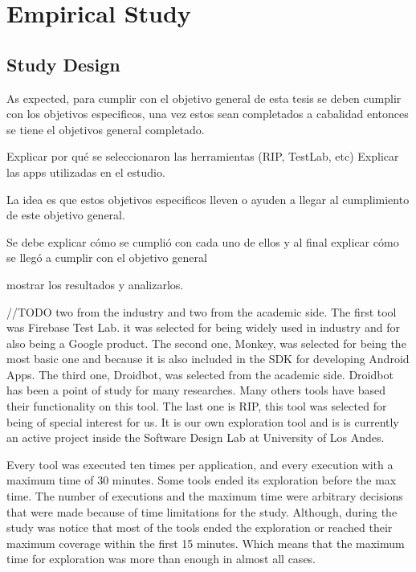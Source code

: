 
\chapter{Empirical Study} %

\label{Chapter5} %

\section{Study Design}

As expected, para cumplir con el objetivo general de esta tesis se deben cumplir con los objetivos especificos, una vez estos sean completados a cabalidad entonces se tiene el objetivos general completado.

Explicar por qué se seleccionaron las herramientas (RIP, TestLab, etc)
Explicar las apps utilizadas en el estudio.

La idea es que estos objetivos especificos lleven o ayuden a llegar al cumplimiento de este objetivo general.

Se debe explicar cómo se cumplió con cada uno de ellos y al final explicar cómo se llegó a cumplir con el objetivo general

mostrar los resultados y analizarlos.

//TODO
two from the industry and two from the academic side. The first tool was Firebase Test Lab. it was selected for being widely used in industry and for also being a Google product. The second one, Monkey, was selected for being the most basic one and because it is also included in the SDK for developing Android Apps. The third one, Droidbot, was selected from the academic side. Droidbot has been a point of study for many researches. Many others tools have based their functionality on this tool. The last one is RIP, this tool was selected for being of special interest for us. It is our own exploration tool and is is currently an active project inside the Software Design Lab at University of Los Andes. 

Every tool was executed ten times per application, and every execution with a maximum time of 30 minutes. Some tools ended its exploration before the max time. 
The number of executions and the maximum time were arbitrary decisions that were made because of time limitations for the study. Although, during the study was notice that most of the tools ended the exploration or reached their maximum coverage within the first 15 minutes. Which means that the maximum time for exploration was more than enough in almost all cases. 
 



